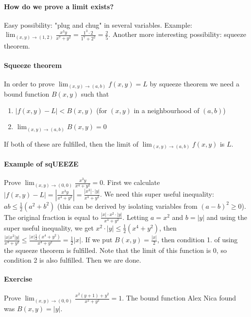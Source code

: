 \documentclass[tikz,10pt,letter]{article}
\theoremstyle{plain}
\theoremstyle{definition}
\begin{document}
\paragraph{How do we prove a limit exists?}
Easy possibility: "plug and chug" in several variables. Example: $\lim_{(x,y)\rightarrow(1,2)}\frac{x^3y}{x^7+y^2}=\frac{1^3\cdot2}{1^7+2^2}=\frac{2}{5}$. Another more interesting possibility: squeeze theorem. 

\paragraph{Squeeze theorem}
In order to prove $\lim_{(x,y)\rightarrow(a,b)}f(x,y)=L$ by squeeze theorem we need a bound function $B(x,y)$ such that \begin{enumerate}
    \item $|f(x,y)-L|<B(x,y)$ (for $(x,y)$ in a neighbourhood of $(a,b)$) 
    \item $\lim_{(x,y)\rightarrow(a,b)}B(x,y)=0$
\end{enumerate}
If both of these are fulfilled, then the limit of $\lim_{(x,y)\rightarrow(a,b)}f(x,y)$ is $L$. 


\paragraph{Example of sqUEEZE}
Prove $\lim_{(x,y)\rightarrow(0,0)}\frac{x^3y}{x^4+y^2}=0$. First we calculate $|f(x,y)-L|=\left|\frac{x^3y}{x^4+y^2}\right|=\frac{|x^3|\cdot|y|}{x^4+y^2}$. We need this super useful inequality: $ab\leq\frac{1}{2}(a^2+b^2)$ (this can be derived by isolating variables from $(a-b)^2\geq0$). The original fraction is equal to $\frac{|x|\cdot x^2\cdot|y|}{x^4+y^2}$. Letting $a=x^2$ and $b=|y|$ and using the super useful inequality, we get $x^2\cdot|y|\leq\frac{1}{2}(x^4+y^2)$, then $\frac{|x|x^2|y|}{x^4+y^2}\leq\frac{|x|\frac{1}{2}(x^4+y^2)}{x^4+y^2}=\frac{1}{2}|x|$. If we put $B(x,y)=\frac{|x|}{2}$, then condition 1. of using the squeeze theorem is fulfilled. Note that the limit of this function is $0$, so condition 2 is also fulfilled. Then we are done. 

\paragraph{Exercise}
Prove $\lim_{(x,y)\rightarrow(0,0)}\frac{x^2(y+1)+y^2}{x^2+y^2}=1$. The bound function Alex Nica found was $B(x,y)=|y|$. 
\end{document}
